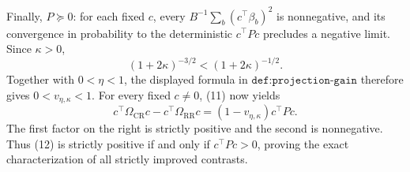 Finally, \(P\succeq0\): for each fixed \(c\), every \(B^{-1}\sum_b(c^\top\beta_b)^2\) is nonnegative, and its convergence in probability to the deterministic \(c^\top Pc\) precludes a negative limit.  Since \(\kappa>0\),
\[
 (1+2\kappa)^{-3/2}<(1+2\kappa)^{-1/2}.
\]
Together with \(0<\eta<1\), the displayed formula in \(\texttt{def:projection-gain}\) therefore gives \(0<v_{\eta,\kappa}<1\).  For every fixed \(c\ne0\), (11) now yields
\[
 c^\top\Omega_{\mathrm{CR}}c-c^\top\Omega_{\mathrm{RR}}c
 =(1-v_{\eta,\kappa})c^\top Pc.                            \tag{12}
\]
The first factor on the right is strictly positive and the second is nonnegative.  Thus (12) is strictly positive if and only if \(c^\top Pc>0\), proving the exact characterization of all strictly improved contrasts.